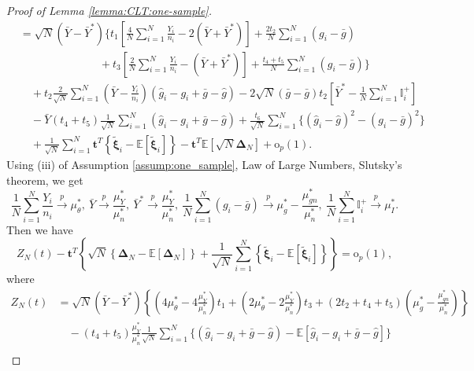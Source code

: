 \documentclass[12pt,letterpaper]{article}
\begin{document}
\begin{proof}[Proof of Lemma \ref{lemma:CLT:one-sample}]
$$\begin{array}{rl}
&\displaystyle=\sqrt{N}(\bar{Y}-\bar{Y}^*)\Bigg\{t_1\left[\frac{4}{N}\sum_{i=1}^N\frac{Y_i}{n_i}-2(\bar{Y}+\bar{Y}^*)\right]+\frac{2t_2}{N}\sum_{i=1}^N(g_i-\bar{g})\\
&\displaystyle\quad\quad\quad\quad\quad\quad\quad\ +t_3\left[\frac{2}{N}\sum_{i=1}^N\frac{Y_i}{n_i}-(\bar{Y}+\bar{Y}^*)\right]+\frac{t_4+t_5}{N}\sum_{i=1}^N(g_i-\bar{g})\Bigg\}\\
&\displaystyle\quad+t_2\frac{2}{\sqrt{N}}\sum_{i=1}^N\left(\bar{Y}-\frac{Y_i}{n_i}\right)(\hat{g}_i-g_i+\bar{g}-\hat{g})-2\sqrt{N}(\bar{g}-\bar{g})t_2\left[\bar{Y}^*-\frac{1}{N}\sum_{i=1}^N\mathbb{I}_i^{+}\right]\\
&\displaystyle\quad-\bar{Y}(t_4+t_5)\frac{1}{\sqrt{N}}\sum_{i=1}^N(\hat{g}_i-g_i+\bar{g}-\hat{g})+\frac{t_6}{\sqrt{N}}\sum_{i=1}^N\{(\hat{g}_i-\hat{g})^2-(g_i-\bar{g})^2\}\\
&\displaystyle\quad+\frac{1}{\sqrt{N}}\sum_{i=1}^N\mathbf{t}^T\left\{\tilde{\boldsymbol{\xi}}_i-\mathbb{E}[\tilde{\boldsymbol{\xi}}_i]\right\}-\mathbf{t}^T\mathbb{E}[\sqrt{N}\mathbf{\Delta}_N]+\mathrm{o}_p(1).
\end{array}$$
Using (iii) of Assumption \ref{assump:one_sample}, Law of Large Numbers,  Slutsky's theorem, we get
$$\displaystyle\frac{1}{N}\sum_{i=1}^N\frac{Y_i}{n_i}\overset{p}{\rightarrow}\mu_{\theta}^*, \ \displaystyle\bar{Y}\overset{p}{\rightarrow}\frac{\mu_Y^*}{\mu_n^*}, \ \displaystyle\bar{Y}^*\overset{p}{\rightarrow}\frac{\mu_Y^*}{\mu_n^*},\  \displaystyle\frac{1}{N}\sum_{i=1}^N(g_i-\bar{g})\overset{p}{\rightarrow}\mu_g^*-\frac{\mu_{gn}^*}{\mu_n^*},\ \displaystyle\frac{1}{N}\sum_{i=1}^N\mathbb{I}_i^{+}\overset{p}{\rightarrow}\mu_I^*.$$ 
Then we have 
\begin{equation}\label{eq:Z:N:equiv}
Z_N(t)-\mathbf{t}^T\left\{\sqrt{N}\left\{\mathbf{\Delta}_N-\mathbb{E}[\mathbf{\Delta}_N]\right\}+\frac{1}{\sqrt{N}}\sum_{i=1}^N\left\{\tilde{\boldsymbol{\xi}}_i-\mathbb{E}[\tilde{\boldsymbol{\xi}}_i]\right\}\right\}=\mathrm{o}_p(1),
\end{equation}
where 
\begin{equation}\label{eq:Z:N:t}
\begin{array}{rl}
Z_N(t)\!\!\!\!&\displaystyle=\sqrt{N}(\bar{Y}\!-\!\bar{Y}^*)\left\{\left(4\mu_{\theta}^*\!-\!4\frac{\mu_Y^*}{\mu_n^*}\right)\!t_1\!+\!\left(2\mu_{\theta}^*\!-\!2\frac{\mu_Y^*}{\mu_n^*}\right)\!t_3\!+\!(2t_2\!+\!t_4\!+\!t_5)\!\left(\mu_g^*\!-\!\frac{\mu_{gn}^*}{\mu_n^*}\right)\right\}\\
&\displaystyle\quad-(t_4+t_5)\frac{\mu_Y^*}{\mu_n^*}\frac{1}{\sqrt{N}}\sum_{i=1}^N\{(\hat{g}_i-g_i+\bar{g}-\hat{g})-\mathbb{E}[\hat{g}_i-g_i+\bar{g}-\hat{g}]\}\\

\end{array}
\end{equation}
\end{proof}
\end{document}
